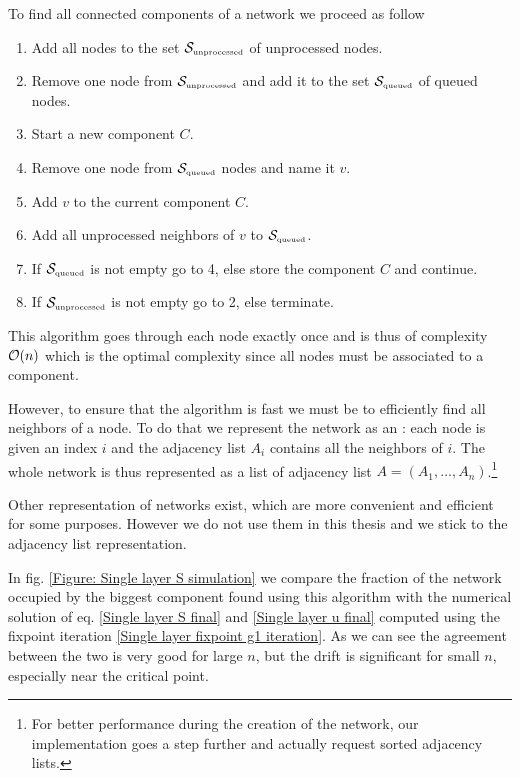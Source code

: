 \documentclass[
11pt, %
english, %
singlespacing, %
nolistspacing, %
liststotoc, %
headsepline, %
]{MastersDoctoralThesis} %
\begin{document}
To find all connected components of a network we proceed as follow
\begin{enumerate}
	\item Add all nodes to the set $\mathcal{S}_{\text{\tiny unprocessed}}$ of unprocessed nodes.
	\item Remove one node from $\mathcal{S}_{\text{\tiny unprocessed}}$ and add it to the set $\mathcal{S}_{\text{\tiny queued}}$ of queued nodes.
	\item Start a new component $C$.
	\item Remove one node from $\mathcal{S}_{\text{\tiny queued}}$ nodes and name it $v$.
	\item Add $v$ to the current component $C$.
	\item Add all unprocessed neighbors of $v$ to $\mathcal{S}_{\text{\tiny queued}}$.
	\item If $\mathcal{S}_{\text{\tiny queued}}$ is not empty go to 4, else store the component $C$ and continue.
	\item If $\mathcal{S}_{\text{\tiny unprocessed}}$ is not empty go to 2, else terminate.
\end{enumerate}
This algorithm goes through each node exactly once and is thus of complexity $\mathcal{O}\!\left(n\right)$ which is the optimal complexity since all nodes must be associated to a component.

However, to ensure that the algorithm is fast we must be to efficiently find all neighbors of a node. To do that we represent the network as an : each node is given an index $i$ and the adjacency list $A_i$ contains all the neighbors of $i$. The whole network is thus represented as a list of adjacency list $A = (A_1, \dots, A_n)$.\footnote{For better performance during the creation of the network, our implementation goes a step further and actually request sorted adjacency lists.}

Other representation of networks exist, which are more convenient and efficient for some purposes. However we do not use them in this thesis and we stick to the adjacency list representation.

In fig. \ref{Figure: Single layer S simulation} we compare the fraction of the network occupied by the biggest component found using this algorithm with the numerical solution of eq. \eqref{Single layer S final} and \eqref{Single layer u final} computed using the fixpoint iteration \eqref{Single layer fixpoint g1 iteration}. As we can see the agreement between the two is very good for large $n$, but the drift is significant for small $n$, especially near the critical point.
\end{document}
